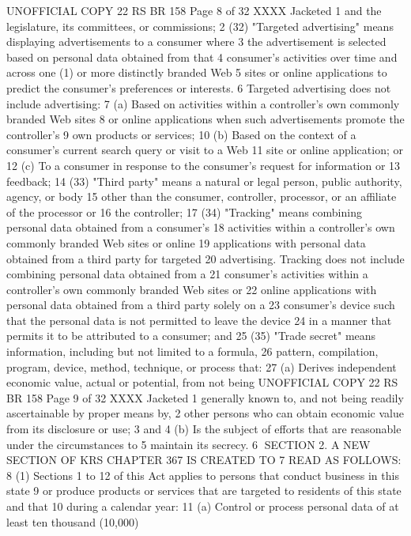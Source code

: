 UNOFFICIAL COPY 22 RS BR 158
Page 8 of 32
XXXX Jacketed
1 and the legislature, its committees, or commissions;
2 (32) "Targeted advertising" means displaying advertisements to a consumer where
3 the advertisement is selected based on personal data obtained from that
4 consumer's activities over time and across one (1) or more distinctly branded Web
5 sites or online applications to predict the consumer's preferences or interests.
6 Targeted advertising does not include advertising:
7 (a) Based on activities within a controller's own commonly branded Web sites
8 or online applications when such advertisements promote the controller's
9 own products or services;
10 (b) Based on the context of a consumer's current search query or visit to a Web
11 site or online application; or
12 (c) To a consumer in response to the consumer's request for information or
13 feedback;
14 (33) "Third party" means a natural or legal person, public authority, agency, or body
15 other than the consumer, controller, processor, or an affiliate of the processor or
16 the controller;
17 (34) "Tracking" means combining personal data obtained from a consumer's
18 activities within a controller's own commonly branded Web sites or online
19 applications with personal data obtained from a third party for targeted
20 advertising. Tracking does not include combining personal data obtained from a
21 consumer's activities within a controller's own commonly branded Web sites or
22 online applications with personal data obtained from a third party solely on a
23 consumer's device such that the personal data is not permitted to leave the device
24 in a manner that permits it to be attributed to a consumer; and
25 (35) "Trade secret" means information, including but not limited to a formula,
26 pattern, compilation, program, device, method, technique, or process that:
27 (a) Derives independent economic value, actual or potential, from not being 
UNOFFICIAL COPY 22 RS BR 158
Page 9 of 32
XXXX Jacketed
1 generally known to, and not being readily ascertainable by proper means by,
2 other persons who can obtain economic value from its disclosure or use;
3 and
4 (b) Is the subject of efforts that are reasonable under the circumstances to
5 maintain its secrecy.
6 SECTION 2. A NEW SECTION OF KRS CHAPTER 367 IS CREATED TO
7 READ AS FOLLOWS:
8 (1) Sections 1 to 12 of this Act applies to persons that conduct business in this state
9 or produce products or services that are targeted to residents of this state and that
10 during a calendar year:
11 (a) Control or process personal data of at least ten thousand (10,000)
